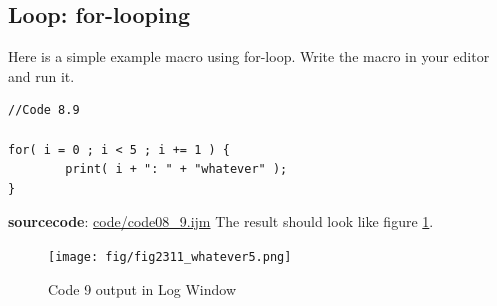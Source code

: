 \documentclass[11pt,a4paper,oneside]{report}
\begin{document}
\subsection{Loop: for-looping}
Here is a simple example macro using for-loop. Write the macro in your editor and run it. 

\begin{lstlisting}[morekeywords={*, for}]
//Code 8.9

for( i = 0 ; i < 5 ; i += 1 ) {
		print( i + ": " + "whatever" );
}

\end{lstlisting}
\textbf{sourcecode}: \href{http://www.example.com/contents}{code/code08\_9.ijm}
The result should look like figure \ref{fig_whateverOut}.

\begin{figure}[!ht]
\begin{center}
\texttt{[image: fig/fig2311\_whatever5.png]}
\caption{Code 9 output in Log Window}
\label{fig_whateverOut}
\end{center}
\end{figure}
\end{document}
